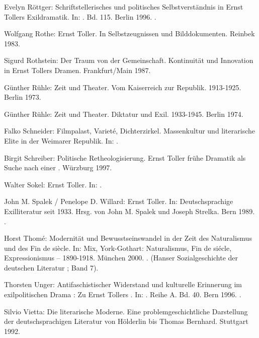 \begin{BibList}{}
  Evelyn Röttger:
  Schriftstellerisches und politisches Selbstverständnis in Ernst
  Tollers Exildramatik.
  In: . Bd. 115. 
  Berlin 1996. .

  Wolfgang Rothe:
  Ernst Toller. In Selbstzeugnissen und Bilddokumenten.
  Reinbek 1983.

  Sigurd Rothstein:
  Der Traum von der Gemeinschaft. Kontinuität und Innovation in Ernst Tollers
  Dramen. 
  Frankfurt/Main 1987.

  Günther Rühle:
  Zeit und Theater. Vom Kaiserreich zur Republik. 1913-1925.
  Berlin 1973.

  Günther Rühle:
  Zeit und Theater. Diktatur und Exil. 1933-1945.
  Berlin 1974.

  Falko Schneider:
  Filmpalast, Varieté, Dichterzirkel. Massenkultur und literarische Elite in
  der Weimarer Republik.
  In: .

  Birgit Schreiber:
  Politische Retheologisierung. Ernst Toller frühe Dramatik als Suche nach
  einer \Cite{Politik der reinen Mittel}. 
  Würzburg 1997.

  Walter Sokel:
  Ernst Toller.
  In: . 

  John M. Spalek / Penelope D. Willard: 
  Ernst Toller.
  In: Deutschsprachige Exilliteratur seit 1933. 
  Hrsg. von John M. Spalek und Joseph Strelka. 
  Bern 1989. .

  Horst Thomé: 
  Modernität und Bewusstseinswandel in der Zeit des Naturalismus und des Fin
  de siècle. 
  In: Mix, York-Gothart: Naturalismus, Fin de siécle, Expressionismus --
  1890-1918. München 2000. .
  (Hanser Sozialgeschichte der deutschen Literatur ; Band 7). 

  Thorsten Unger:
  Antifaschistischer Widerstand und kulturelle Erinnerung im exilpolitischen
  Drama : Zu Ernst Tollers \Cite{Pastor Hall}.
  In: . Reihe A. Bd. 40.
  Bern 1996. .

  Silvio Vietta:
  Die literarische Moderne. Eine problemgeschichtliche Darstellung der
  deutschsprachigen Literatur von Hölderlin bis Thomas Bernhard.
  Stuttgart 1992.


\end{BibList}
